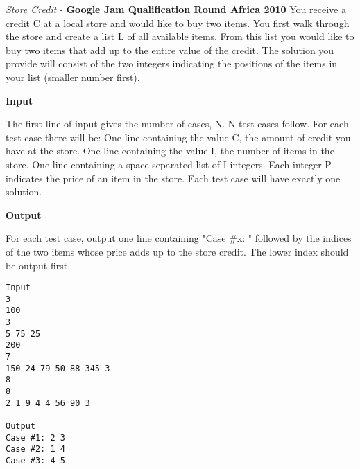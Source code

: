 \begin{problem}{\textit{Store Credit} - \textbf{Google Jam Qualification Round Africa 2010}}
You receive a credit C at a local store and would like to buy two items. You first walk through the store and create a list L of all available items. From this list you would like to buy two items that add up to the entire value of the credit. The solution you provide will consist of the two integers indicating the positions of the items in your list (smaller number first).

\textbf{Input}

The first line of input gives the number of cases, N. N test cases follow. For each test case there will be:
One line containing the value C, the amount of credit you have at the store.
One line containing the value I, the number of items in the store.
One line containing a space separated list of I integers. Each integer P indicates the price of an item in the store. Each test case will have exactly one solution.

\textbf{Output}

For each test case, output one line containing "Case \#x: " followed by the indices of the two items whose price adds up to the store credit. The lower index should be output first.
\begin{framed}
	\begin{verbatim}
Input 
3
100
3
5 75 25
200
7
150 24 79 50 88 345 3
8
8
2 1 9 4 4 56 90 3

Output 
Case #1: 2 3
Case #2: 1 4
Case #3: 4 5
	\end{verbatim}
\end{framed}

\end{problem}

